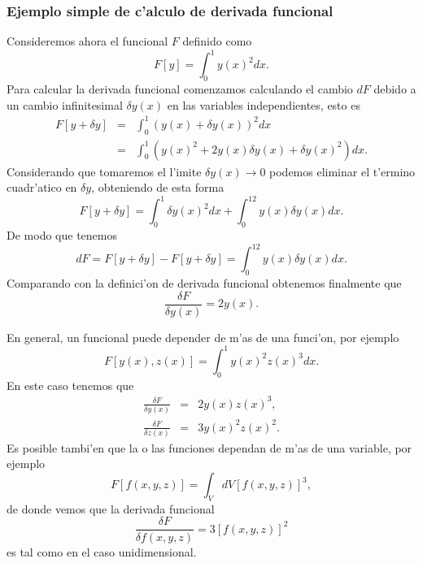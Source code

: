 \subsubsection{Ejemplo simple de c'alculo de derivada funcional}

Consideremos ahora el funcional $F$ definido como
\begin{equation}
F\left[ y\right]=\int_0^1y(x)^2dx.
\end{equation}
Para calcular la derivada funcional comenzamos calculando el cambio $dF$ debido
a un cambio infinitesimal $\delta y(x)$ en las variables independientes, esto es
\begin{eqnarray}
F\left[ y+\delta y\right]&=&\int_0^1(y(x)+\delta y(x))^2 dx 
\\
&=&\int_0^1(y(x)^2+2y(x)\delta y(x)+\delta y(x)^2) dx.
\end{eqnarray}
Considerando que tomaremos el l'imite $\delta y(x)\rightarrow 0$ podemos eliminar
el t'ermino cuadr'atico en $\delta y$, obteniendo de esta forma
\begin{equation}
F\left[ y+\delta y\right]=\int_0^1\delta y(x)^2 dx 
+\int_0^12y(x)\delta y(x) dx.
\end{equation}
De modo que tenemos
\begin{equation}
dF=F\left[ y+\delta y\right]-F\left[ y+\delta y\right]=\int_0^12y(x)\delta y(x)
dx.
\end{equation}
Comparando con la definici'on de derivada funcional obtenemos finalmente que
\begin{equation}
\frac{\delta F}{\delta y(x)}=2y(x).
\end{equation}

En general, un funcional puede depender de m'as de una funci'on, por ejemplo
\begin{equation}
F\left[y(x), z(x)\right]=\int_0^1y(x)^2z(x)^3dx.
\end{equation}
En este caso tenemos que
\begin{eqnarray}
\frac{\delta F}{\delta y(x)}&=&2y(x)z(x)^3,
\\
\frac{\delta F}{\delta z(x)}&=&3y(x)^2z(x)^2.
\end{eqnarray}
Es posible tambi'en que la o las funciones dependan de m'as de una variable, por
ejemplo
\begin{equation}
F\left[ f(x,y,z)\right]=\int_{V}dV \left[ f(x,y,z)\right] ^3, 
\end{equation}
de donde vemos que la derivada funcional
\begin{equation}
\frac{\delta F}{\delta f(x,y,z)}=3\left[ f(x,y,z)\right] ^2
\end{equation}
es tal como en el caso unidimensional.

